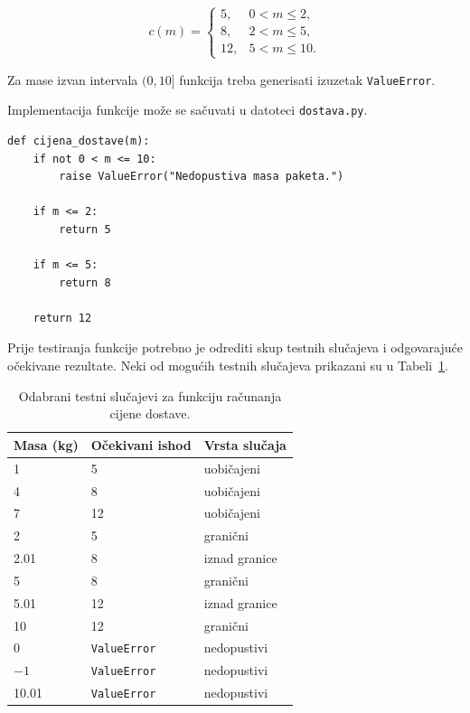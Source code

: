\[
c(m)=
\begin{cases}
	5, & 0<m\leq 2,\\
	8, & 2<m\leq 5,\\
	12, & 5<m\leq 10.
\end{cases}
\]

Za mase izvan intervala $(0,10]$ funkcija treba generisati 
izuzetak \texttt{ValueError}.

Implementacija funkcije može se sačuvati u datoteci 
\texttt{dostava.py}.

\begin{verbatim}
def cijena_dostave(m):
    if not 0 < m <= 10:
        raise ValueError("Nedopustiva masa paketa.")

    if m <= 2:
        return 5

    if m <= 5:
        return 8

    return 12
\end{verbatim}

Prije testiranja funkcije potrebno je odrediti skup 
testnih slučajeva i odgovarajuće očekivane rezultate. 
Neki od mogućih testnih slučajeva prikazani su u 
Tabeli~\ref{tab:test-dostava}.

\begin{table}[ht]
	\centering
	\begin{tabular}{lll}
		\hline
		Masa (kg) & Očekivani ishod & Vrsta slučaja \\ \hline
		1         & 5 & uobičajeni \\
		4         & 8 & uobičajeni \\
		7         & 12 & uobičajeni \\
		2         & 5 & granični \\
		2.01      & 8 & iznad granice \\
		5         & 8 & granični \\
		5.01      & 12 & iznad granice \\
		10        & 12 & granični \\
		0         & \texttt{ValueError} & nedopustivi \\
		$-1$      & \texttt{ValueError} & nedopustivi \\
		10.01     & \texttt{ValueError} & nedopustivi \\ \hline
	\end{tabular}
	\caption{Odabrani testni slučajevi za funkciju 
		računanja cijene dostave.}
	\label{tab:test-dostava}
\end{table}

